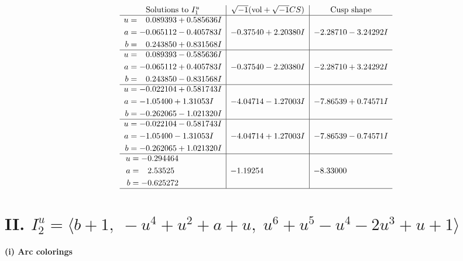 \documentclass[1p]{elsarticle_modified}
\theoremstyle{definition}
\newcommand{\I}{\sqrt{-1}}
\begin{document}
$$\begin{array}{c|c|c}
\text{Solutions to }I^u_{1}& \I (\text{vol} + \sqrt{-1}CS) & \text{Cusp shape}\\
 \hline 
\begin{aligned}
u &= \phantom{-}0.089393 + 0.585636 I \\
a &= -0.065112 - 0.405783 I \\
b &= \phantom{-}0.243850 + 0.831568 I\end{aligned}
 & -0.37540 + 2.20380 I & -2.28710 - 3.24292 I \\ \hline\begin{aligned}
u &= \phantom{-}0.089393 - 0.585636 I \\
a &= -0.065112 + 0.405783 I \\
b &= \phantom{-}0.243850 - 0.831568 I\end{aligned}
 & -0.37540 - 2.20380 I & -2.28710 + 3.24292 I \\ \hline\begin{aligned}
u &= -0.022104 + 0.581743 I \\
a &= -1.05400 + 1.31053 I \\
b &= -0.262065 - 1.021320 I\end{aligned}
 & -4.04714 - 1.27003 I & -7.86539 + 0.74571 I \\ \hline\begin{aligned}
u &= -0.022104 - 0.581743 I \\
a &= -1.05400 - 1.31053 I \\
b &= -0.262065 + 1.021320 I\end{aligned}
 & -4.04714 + 1.27003 I & -7.86539 - 0.74571 I \\ \hline\begin{aligned}
u &= -0.294464\phantom{ +0.000000I} \\
a &= \phantom{-}2.53525\phantom{ +0.000000I} \\
b &= -0.625272\phantom{ +0.000000I}\end{aligned}
 & -1.19254\phantom{ +0.000000I} & -8.33000\phantom{ +0.000000I}\\
 \hline 
 \end{array}$$\newpage\newpage\renewcommand{\arraystretch}{1}
\centering \section*{II. $I^u_{2}= \langle b+1,\;- u^4+u^2+a+u,\;u^6+u^5- u^4-2 u^3+u+1 \rangle$}
\flushleft \textbf{(i) Arc colorings}\\
\end{document}
